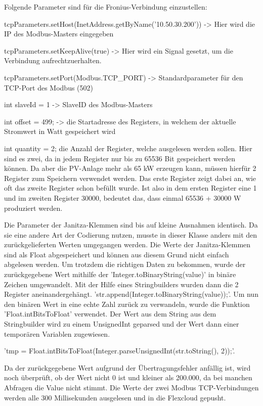 Folgende Parameter sind für die Fronius-Verbindung einzustellen:


\begin{compactitem}
\item tcpParameters.setHost(InetAddress.getByName('10.50.30.200')) -> Hier wird die IP des Modbus-Masters eingegeben
\item tcpParameters.setKeepAlive(true) -> Hier wird ein Signal gesetzt, um die Verbindung aufrechtzuerhalten.
\item tcpParameters.setPort(Modbus.TCP\_PORT) -> Standardparameter für den TCP-Port des Modbus (502)
\item int slaveId = 1 -> SlaveID des Modbus-Masters
\item int offset = 499; -> die Startadresse des Registers, in welchem der aktuelle Stromwert in Watt gespeichert wird
\item int quantity = 2; die Anzahl der Register, welche ausgelesen werden sollen. Hier sind es zwei, da in jedem Register nur bis zu 65536 Bit gespeichert werden können. Da aber die PV-Anlage mehr als 65 kW erzeugen kann, müssen hierfür 2 Register zum Speichern verwendet werden. Das erste Register zeigt dabei an, wie oft das zweite Register schon befüllt wurde. Ist also in dem ersten Register eine 1 und im zweiten Register 30000, bedeutet das, dass einmal 65536 + 30000 W produziert werden.
\end{compactitem}
Die Parameter der Janitza-Klemmen sind bis auf kleine Ausnahmen identisch.
Da sie eine andere Art der Codierung nutzen, musste in dieser Klasse anders mit den zurückgelieferten Werten umgegangen werden. Die Werte der Janitza-Klemmen sind als Float abgespeichert und können aus diesem Grund nicht einfach abgelesen werden. Um trotzdem die richtigen Daten zu bekommen, wurde der zurückgegebene Wert mithilfe der 'Integer.toBinaryString(value)' in binäre Zeichen umgewandelt. Mit der Hilfe eines Stringbuilders wurden dann die 2 Register aneinandergehängt. 'str.append(Integer.toBinaryString(value));'. Um nun den binären Wert in eine echte Zahl zurück zu verwandeln, wurde die Funktion 'Float.intBitsToFloat' verwendet. Der Wert aus dem String aus dem Stringbuilder wird zu einem UnsignedInt geparsed und der Wert dann einer temporären Variablen zugewiesen.


'tmp = Float.intBitsToFloat(Integer.parseUnsignedInt(str.toString(), 2));'.


Da der zurückgegebene Wert aufgrund der Übertragungsfehler anfällig ist, wird noch überprüft, ob der Wert nicht 0 ist und kleiner als 200.000, da bei manchen Abfragen die Value nicht stimmt. Die Werte der zwei Modbus TCP-Verbindungen werden alle 300 Millisekunden ausgelesen und in die Flexcloud gepusht.



